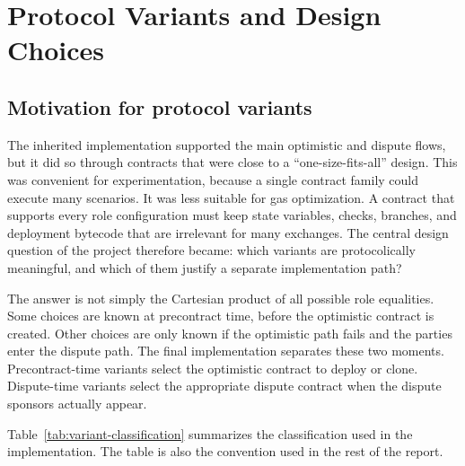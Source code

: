 \chapter{Protocol Variants and Design Choices}
\label{chap:variants}

\section{Motivation for protocol variants}

The inherited implementation supported the main optimistic and dispute flows, but it did so
through contracts that were close to a ``one-size-fits-all'' design. This was convenient for
experimentation, because a single contract family could execute many scenarios. It was less
suitable for gas optimization. A contract that supports every role configuration must keep
state variables, checks, branches, and deployment bytecode that are irrelevant for many
exchanges. The central design question of the project therefore became: which variants are
protocolically meaningful, and which of them justify a separate implementation path?

The answer is not simply the Cartesian product of all possible role equalities. Some choices
are known at precontract time, before the optimistic contract is created. Other choices are
only known if the optimistic path fails and the parties enter the dispute path. The final
implementation separates these two moments. Precontract-time variants select the optimistic
contract to deploy or clone. Dispute-time variants select the appropriate dispute contract
when the dispute sponsors actually appear.

Table~\ref{tab:variant-classification} summarizes the classification used in the
implementation. The table is also the convention used in the rest of the report.

